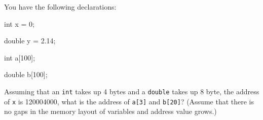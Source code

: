 You have the following declarations:



\begin{consolethree}[escapeinside=||]

int x = 0;

double y = 2.14;

int a[100];

double b[100];

\end{consolethree}



Assuming that an \texttt{int} takes up 4 bytes and a \texttt{double} takes up 8 byte, the address of \texttt{x} is 120004000, what is the address of \texttt{a[3]} and \texttt{b[20]}? (Assume that there is no gaps in the memory layout of variables and address value grows.)

